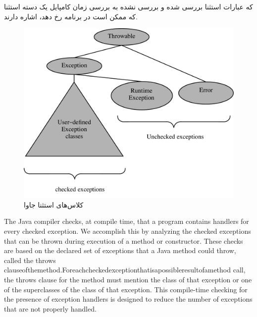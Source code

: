 \documentclass[a4paper,12pt]{report}
\begin{document}
	که عبارات استثنا بررسی شده و بررسی نشده به بررسی زمان کامپایل یک دسته استثنا که ممکن است در برنامه 
	رخ دهد، اشاره دارند.
	\begin{figure}[!h]
		\label{fig1:subsec4:sec3:chap13}
		\centering
		\includegraphics[width=0.9\linewidth,bb=0 0 713.19 575.58]{image/Figure_13.3.pdf}
		\caption{
			کلاس‌های استثنا جاوا}
	\end{figure}


	The Java compiler checks, at compile time, that a program contains handlers for every
	checked exception. We accomplish this by analyzing the checked exceptions that
	can be thrown during execution of a method or constructor. These checks are based
	on the declared set of exceptions that a Java method could throw, called the throws
	clauseofthemethod.Foreachcheckedexceptionthatisapossibleresultofamethod
	call, the throws clause for the method must mention the class of that exception or
	one of the superclasses of the class of that exception. This compile-time checking for
	the presence of exception handlers is designed to reduce the number of exceptions
	that are not properly handled.
\end{document}
